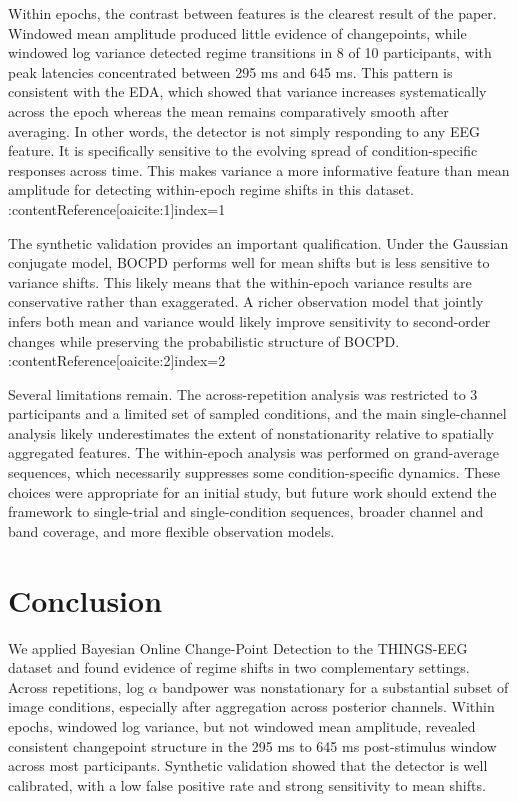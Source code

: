 \documentclass[11pt,letterpaper]{article}
\begin{document}
Within epochs, the contrast between features is the clearest result of the paper. Windowed mean amplitude produced little evidence of changepoints, while windowed log variance detected regime transitions in 8 of 10 participants, with peak latencies concentrated between 295 ms and 645 ms. This pattern is consistent with the EDA, which showed that variance increases systematically across the epoch whereas the mean remains comparatively smooth after averaging. In other words, the detector is not simply responding to any EEG feature. It is specifically sensitive to the evolving spread of condition-specific responses across time. This makes variance a more informative feature than mean amplitude for detecting within-epoch regime shifts in this dataset. :contentReference[oaicite:1]{index=1}

The synthetic validation provides an important qualification. Under the Gaussian conjugate model, BOCPD performs well for mean shifts but is less sensitive to variance shifts. This likely means that the within-epoch variance results are conservative rather than exaggerated. A richer observation model that jointly infers both mean and variance would likely improve sensitivity to second-order changes while preserving the probabilistic structure of BOCPD. :contentReference[oaicite:2]{index=2}

Several limitations remain. The across-repetition analysis was restricted to 3 participants and a limited set of sampled conditions, and the main single-channel analysis likely underestimates the extent of nonstationarity relative to spatially aggregated features. The within-epoch analysis was performed on grand-average sequences, which necessarily suppresses some condition-specific dynamics. These choices were appropriate for an initial study, but future work should extend the framework to single-trial and single-condition sequences, broader channel and band coverage, and more flexible observation models.

\section{Conclusion}

We applied Bayesian Online Change-Point Detection to the THINGS-EEG dataset and found evidence of regime shifts in two complementary settings. Across repetitions, log $\alpha$ bandpower was nonstationary for a substantial subset of image conditions, especially after aggregation across posterior channels. Within epochs, windowed log variance, but not windowed mean amplitude, revealed consistent changepoint structure in the 295 ms to 645 ms post-stimulus window across most participants. Synthetic validation showed that the detector is well calibrated, with a low false positive rate and strong sensitivity to mean shifts. 
\end{document}
